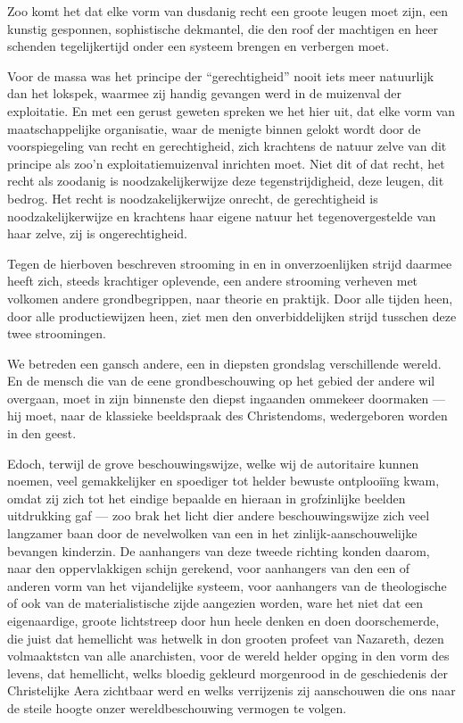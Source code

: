 \documentclass[a4paper, 12pt, oneside, dutch]{article}
\begin{document}
Zoo komt het dat elke vorm van dusdanig recht een groote leugen moet zijn, een kunstig gesponnen, sophistische dekmantel, die den roof der machtigen en heer schenden tegelijkertijd onder een systeem brengen en verbergen moet.

Voor de massa was het principe der "`gerechtigheid"' nooit iets meer natuurlijk dan het lokspek, waarmee zij handig gevangen werd in de muizenval der exploitatie. En met een gerust geweten spreken we het hier uit, dat elke vorm van maatschappelijke organisatie, waar de menigte binnen gelokt wordt door de voorspiegeling van recht en gerechtigheid, zich krachtens de natuur zelve van dit principe als zoo'n exploitatiemuizenval inrichten moet. Niet dit of dat recht, het recht als zoodanig is noodzakelijkerwijze deze tegenstrijdigheid, deze leugen, dit bedrog. Het recht is noodzakelijkerwijze onrecht, de gerechtigheid is noodzakelijkerwijze en krachtens haar eigene natuur het tegenovergestelde van haar zelve, zij is ongerechtigheid.

Tegen de hierboven beschreven strooming in en in onverzoenlijken strijd daarmee heeft zich, steeds krachtiger oplevende, een andere strooming verheven met volkomen andere grondbegrippen, naar theorie en praktijk. Door alle tijden heen, door alle productiewijzen heen, ziet men den onverbiddelijken strijd tusschen deze twee stroomingen.

We betreden een gansch andere, een in diepsten grondslag verschillende wereld. En de mensch die van de eene grondbeschouwing op het gebied der andere wil overgaan, moet in zijn binnenste den diepst ingaanden ommekeer doormaken --- hij moet, naar de klassieke beeldspraak des Christendoms, wedergeboren worden in den geest.

Edoch, terwijl de grove beschouwingswijze, welke wij de autoritaire kunnen noemen, veel gemakkelijker en spoediger tot helder bewuste ontplooiïng kwam, omdat zij zich tot het eindige bepaalde en hieraan in grofzinlijke beelden uitdrukking gaf --- zoo brak het licht dier andere beschouwingswijze zich veel langzamer baan door de nevelwolken van een in het zinlijk-aanschouwelijke bevangen kinderzin. De aanhangers van deze tweede richting konden daarom, naar den oppervlakkigen schijn gerekend, voor aanhangers van den een of anderen vorm van het vijandelijke systeem, voor aanhangers van de theologische of ook van de materialistische zijde aangezien worden, ware het niet dat een eigenaardige, groote lichtstreep door hun heele denken en doen doorschemerde, die juist dat hemellicht was hetwelk in don grooten profeet van Nazareth, dezen volmaaktstcn van alle anarchisten, voor de wereld helder opging in den vorm des levens, dat hemellicht, welks bloedig gekleurd morgenrood in de geschiedenis der Christelijke Aera zichtbaar werd en welks verrijzenis zij aanschouwen die ons naar de steile hoogte onzer wereldbeschouwing vermogen te volgen.
\end{document}
